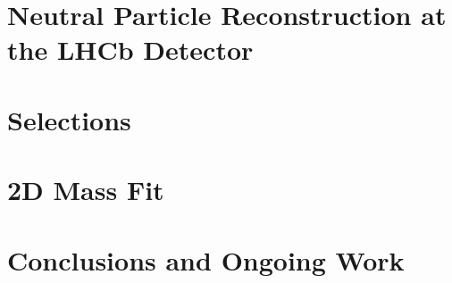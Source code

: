 \documentclass[oneside,12pt]{article}
\begin{document}
\section{Neutral Particle Reconstruction at the LHCb Detector} \label{detector}
\section{Selections} \label{selections}
\section{2D Mass Fit} \label{massfit}
\section{Conclusions and Ongoing Work} \label{conclusion}
\end{document}
